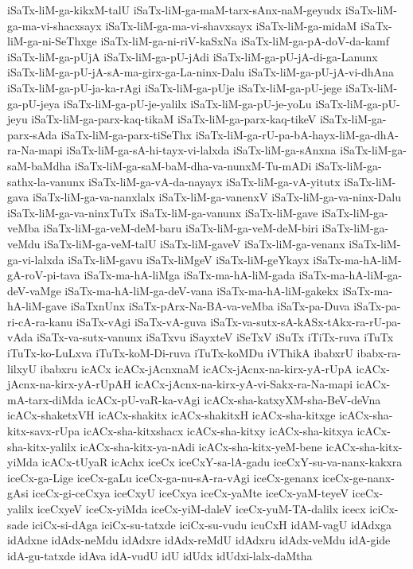 {iSaTx-liM-ga-kikxM-talU
iSaTx-liM-ga-maM-tarx-sAnx-naM-geyudx
iSaTx-liM-ga-ma-vi-shacxsayx
iSaTx-liM-ga-ma-vi-shavxsayx
iSaTx-liM-ga-midaM
iSaTx-liM-ga-ni-SeThxge
iSaTx-liM-ga-ni-riV-kaSxNa
iSaTx-liM-ga-pA-doV-da-kamf
iSaTx-liM-ga-pUjA
iSaTx-liM-ga-pU-jAdi
iSaTx-liM-ga-pU-jA-di-ga-Lanunx
iSaTx-liM-ga-pU-jA-sA-ma-girx-ga-La-ninx-Dalu
iSaTx-liM-ga-pU-jA-vi-dhAna
iSaTx-liM-ga-pU-ja-ka-rAgi
iSaTx-liM-ga-pUje
iSaTx-liM-ga-pU-jege
iSaTx-liM-ga-pU-jeya
iSaTx-liM-ga-pU-je-yalilx
iSaTx-liM-ga-pU-je-yoLu
iSaTx-liM-ga-pU-jeyu
iSaTx-liM-ga-parx-kaq-tikaM
iSaTx-liM-ga-parx-kaq-tikeV
iSaTx-liM-ga-parx-sAda
iSaTx-liM-ga-parx-tiSeThx
iSaTx-liM-ga-rU-pa-bA-hayx-liM-ga-dhA-ra-Na-mapi
iSaTx-liM-ga-sA-hi-tayx-vi-lalxda
iSaTx-liM-ga-sAnxna
iSaTx-liM-ga-saM-baMdha
iSaTx-liM-ga-saM-baM-dha-va-nunxM-Tu-mADi
iSaTx-liM-ga-sathx-la-vanunx
iSaTx-liM-ga-vA-da-nayayx
iSaTx-liM-ga-vA-yitutx
iSaTx-liM-gava
iSaTx-liM-ga-va-nanxlalx
iSaTx-liM-ga-vanenxV
iSaTx-liM-ga-va-ninx-Dalu
iSaTx-liM-ga-va-ninxTuTx
iSaTx-liM-ga-vanunx
iSaTx-liM-gave
iSaTx-liM-ga-veMba
iSaTx-liM-ga-veM-deM-baru
iSaTx-liM-ga-veM-deM-biri
iSaTx-liM-ga-veMdu
iSaTx-liM-ga-veM-talU
iSaTx-liM-gaveV
iSaTx-liM-ga-venanx
iSaTx-liM-ga-vi-lalxda
iSaTx-liM-gavu
iSaTx-liMgeV
iSaTx-liM-geYkayx
iSaTx-ma-hA-liM-gA-roV-pi-tava
iSaTx-ma-hA-liMga
iSaTx-ma-hA-liM-gada
iSaTx-ma-hA-liM-ga-deV-vaMge
iSaTx-ma-hA-liM-ga-deV-vana
iSaTx-ma-hA-liM-gakekx
iSaTx-ma-hA-liM-gave
iSaTxnUnx
iSaTx-pArx-Na-BA-va-veMba
iSaTx-pa-Duva
iSaTx-pa-ri-cA-ra-kanu
iSaTx-vAgi
iSaTx-vA-guva
iSaTx-va-sutx-sA-kASx-tAkx-ra-rU-pa-vAda
iSaTx-va-sutx-vanunx
iSaTxvu
iSayxteV
iSeTxV
iSuTx
iTiTx-ruva
iTuTx
iTuTx-ko-LuLxva
iTuTx-koM-Di-ruva
iTuTx-koMDu
iVThikA
ibabxrU
ibabx-ra-lilxyU
ibabxru
icACx
icACx-jAcnxnaM
icACx-jAcnx-na-kirx-yA-rUpA
icACx-jAcnx-na-kirx-yA-rUpAH
icACx-jAcnx-na-kirx-yA-vi-Sakx-ra-Na-mapi
icACx-mA-tarx-diMda
icACx-pU-vaR-ka-vAgi
icACx-sha-katxyXM-sha-BeV-deVna
icACx-shaketxVH
icACx-shakitx
icACx-shakitxH
icACx-sha-kitxge
icACx-sha-kitx-savx-rUpa
icACx-sha-kitxshacx
icACx-sha-kitxy
icACx-sha-kitxya
icACx-sha-kitx-yalilx
icACx-sha-kitx-ya-nAdi
icACx-sha-kitx-yeM-bene
icACx-sha-kitx-yiMda
icACx-tUyaR
icAchx
iceCx
iceCxY-sa-lA-gadu
iceCxY-su-va-nanx-kakxra
iceCx-ga-Lige
iceCx-gaLu
iceCx-ga-nu-sA-ra-vAgi
iceCx-genanx
iceCx-ge-nanx-gAsi
iceCx-gi-ceCxya
iceCxyU
iceCxya
iceCx-yaMte
iceCx-yaM-teyeV
iceCx-yalilx
iceCxyeV
iceCx-yiMda
iceCx-yiM-daleV
iceCx-yuM-TA-dalilx
icecx
iciCx-sade
iciCx-si-dAga
iciCx-su-tatxde
iciCx-su-vudu
icuCxH
idAM-vagU
idAdxga
idAdxne
idAdx-neMdu
idAdxre
idAdx-reMdU
idAdxru
idAdx-veMdu
idA-gide
idA-gu-tatxde
idAva
idA-vudU
idU
idUdx
idUdxi-lalx-daMtha
}
